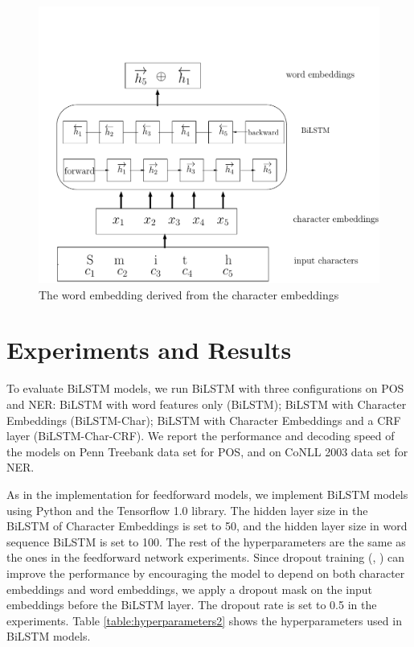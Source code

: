 \begin{figure}
  \centering
  \includegraphics[scale=0.6]{bilstmchar.pdf}
 \caption{The word embedding derived from the character embeddings}
  \label{fig:charlstm}
\end{figure}


 
\section{Experiments and Results}

To evaluate BiLSTM models, we run BiLSTM with three configurations on POS and NER: BiLSTM with word features only (BiLSTM); BiLSTM with Character Embeddings (BiLSTM-Char); BiLSTM with Character Embeddings and a CRF layer (BiLSTM-Char-CRF). We report the performance and decoding speed of the models on Penn Treebank data set for POS, and on CoNLL 2003 data set for NER. 

As in the implementation for feedforward models, we implement BiLSTM models using Python and the Tensorflow 1.0 library. The hidden layer size in the BiLSTM of Character Embeddings is set to 50, and the hidden layer size in word sequence BiLSTM is set to 100. The rest of the hyperparameters are the same as the ones in the feedforward network experiments. Since dropout training (\citeauthor{hinton2012improving}, \citeyear{hinton2012improving}) can improve the performance by encouraging the model to depend on both character embeddings and word embeddings, we apply a dropout mask on the input embeddings before the BiLSTM layer. The dropout rate is set to 0.5 in the experiments. Table \ref{table:hyperparameters2} shows the hyperparameters used in BiLSTM models.

